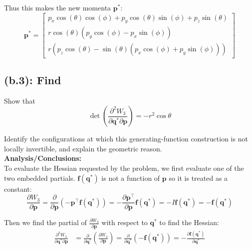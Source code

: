 \documentclass[titlepage]{article}
\begin{document}
\begin{mdframed}[linewidth=1pt, innertopmargin=10pt, innerbottommargin=10pt]
	Thus this makes the new momenta $\boldsymbol{p}^*$:
	\begin{equation}
		\boldsymbol{p}^*=
		\begin{bmatrix}
			p_x\cos(\theta)\cos(\phi)+p_y\cos(\theta)\sin(\phi)+p_z\sin(\theta) \\
			r\cos(\theta)\left(p_y\cos(\phi)-p_x\sin(\phi)\right) \\
			r\left(p_z\cos(\theta)-\sin(\theta)\left(p_x\cos(\phi)+p_y\sin(\phi)\right)\right)
		\end{bmatrix}
		\label{eq:newmomenta}
	\end{equation}
\end{mdframed}

\newpage

\subsection*{(b.3): Find}

Show that
\begin{equation}
	\det\left(\frac{\partial^2W_3}{\partial\boldsymbol{q}^*\partial\boldsymbol{p}}\right)=-r^2\cos\theta
\end{equation}

Identify the configurations at which this generating-function construction is not locally invertible, and explain the geometric reason. \\

\textbf{Analysis/Conclusions:} \\

To evaluate the Hessian requested by the problem, we first evaluate one of the two embedded partials. $\boldsymbol{f}(\boldsymbol{q}^*)$ is not a function of $\boldsymbol{p}$ so it is treated as a constant:
\begin{equation}
	\frac{\partial W_3}{\partial\boldsymbol{p}}=\frac{\partial}{\partial\boldsymbol{p}}\left(-\boldsymbol{p}^\top\boldsymbol{f}(\boldsymbol{q}^*)\right)=-\frac{\partial\boldsymbol{p}^\top}{\partial\boldsymbol{p}}\boldsymbol{f}(\boldsymbol{q}^*)=-I\boldsymbol{f}(\boldsymbol{q}^*)=-\boldsymbol{f}(\boldsymbol{q}^*)
\end{equation}

Then we find the partial of $\frac{\partial W_3}{\partial\boldsymbol{p}}$ with respect to $\boldsymbol{q}^*$ to find the Hessian:
\begin{equation}
	\begin{split}
		\frac{\partial^2W_3}{\partial\boldsymbol{q}^*\partial\boldsymbol{p}}&=\frac{\partial}{\partial\boldsymbol{q}^*}\left(\frac{\partial W_3}{\partial\boldsymbol{p}}\right)=\frac{\partial}{\partial\boldsymbol{q}^*}\left(-\boldsymbol{f}(\boldsymbol{q}^*)\right)=-\frac{\partial\boldsymbol{f}(\boldsymbol{q}^*)}{\partial\boldsymbol{q}^*}
	\end{split}
\end{equation}
\end{document}
